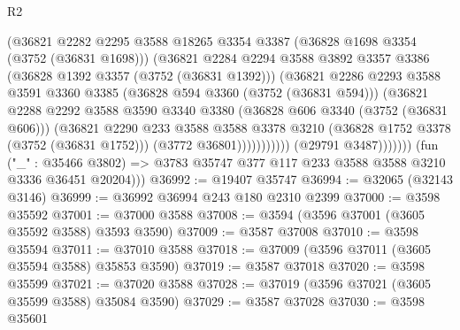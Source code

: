 \begin{lexlean}{R2}
\begin{coremodule}
                              (@36821
                                @2282
                                @2295
                                @3588
                                @18265
                                @3354
                                @3387
                                (@36828 @1698 @3354 (@3752 (@36831 @1698)))
                                (@36821
                                  @2284
                                  @2294
                                  @3588
                                  @3892
                                  @3357
                                  @3386
                                  (@36828 @1392 @3357 (@3752 (@36831 @1392)))
                                  (@36821
                                    @2286
                                    @2293
                                    @3588
                                    @3591
                                    @3360
                                    @3385
                                    (@36828 @594 @3360 (@3752 (@36831 @594)))
                                    (@36821
                                      @2288
                                      @2292
                                      @3588
                                      @3590
                                      @3340
                                      @3380
                                      (@36828 @606 @3340 (@3752 (@36831 @606)))
                                      (@36821
                                        @2290
                                        @233
                                        @3588
                                        @3588
                                        @3378
                                        @3210
                                        (@36828 @1752 @3378 (@3752 (@36831 @1752)))
                                        (@3772 @36801)))))))))))
                    (@29791 @3487)))))))
        (fun ("_" : @35466 @3802) =>
        @3783 @35747 @377 @117 @233 @3588 @3588 @3210 @3336 @36451 @20204)))
@36992 := @19407 @35747
@36994 := @32065 (@32143 @3146)
@36999 := @36992 @36994 @243 @180 @2310 @2399
@37000 := @3598 @35592
@37001 := @37000 @3588
@37008 := @3594 (@3596 @37001 (@3605 @35592 @3588) @3593 @3590)
@37009 := @3587 @37008
@37010 := @3598 @35594
@37011 := @37010 @3588
@37018 := @37009 (@3596 @37011 (@3605 @35594 @3588) @35853 @3590)
@37019 := @3587 @37018
@37020 := @3598 @35599
@37021 := @37020 @3588
@37028 := @37019 (@3596 @37021 (@3605 @35599 @3588) @35084 @3590)
@37029 := @3587 @37028
@37030 := @3598 @35601

\end{coremodule}
\end{lexlean}
